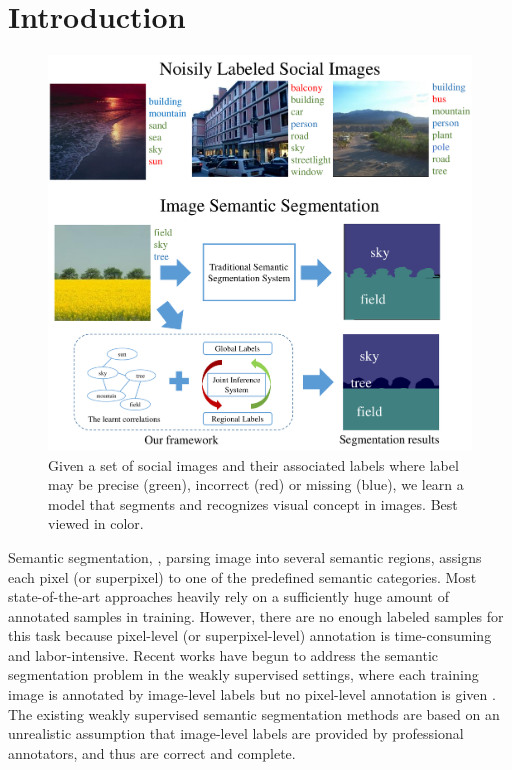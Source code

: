 \section{Introduction}

\begin{figure}[t]
\begin{center}
    \includegraphics[width=1\linewidth]{fig_noisyparsing.pdf}
\end{center}
    \caption{Given a set of social images and their associated labels where label may be precise (green), incorrect (red) or missing (blue), we learn a model that segments and recognizes visual concept in images. Best viewed in color.}
\label{fig:noisyparsing}
\vspace{-3mm}
\end{figure}

Semantic segmentation, \ie, parsing image into several semantic regions, assigns each pixel (or superpixel) to one of the predefined semantic categories.
Most state-of-the-art approaches heavily rely on a sufficiently huge amount of annotated samples in training.
However, there are no enough labeled samples for this task because pixel-level (or superpixel-level) annotation is time-consuming and labor-intensive.
Recent works have begun to address the semantic segmentation problem in the weakly supervised settings, where each training image is annotated by image-level labels but no pixel-level annotation is given \cite{verbeek2007region,vezhnevets2010towards,vezhnevets2011weakly,vezhnevets2012weakly,xu2014tell,zhang2013sparse,zhang2013probabilistic}.
The existing weakly supervised semantic segmentation methods are based on an unrealistic assumption that image-level labels are provided by professional annotators, and thus are correct and complete.



